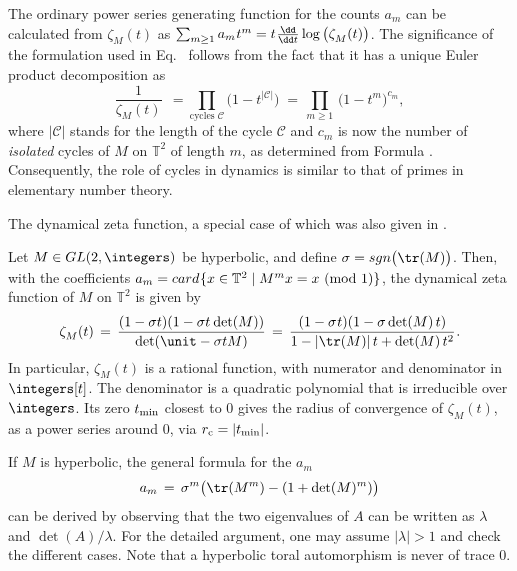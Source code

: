 {The ordinary power series generating function for the counts $a_m$ can
be calculated from $\zeta^{}_{M} (t)$ as $\sum_{m\ge 1} a_m{\hspace{0.5pt}} t^m =
t{\hspace{0.5pt}}\frac{\dd}{\dd t} \log \big(\zeta^{}_{M} (t)\big)$. The
significance of the formulation used in Eq.~
follows from the fact that it has a unique Euler product decomposition
as
\begin{equation} \label{euler1}
   \frac{1}{\zeta^{}_{M} (t)} \;\, = \!
   \prod_{\text{cycles } \mathcal{C}}
   \big( 1- t^{\lvert \mathcal{C}\rvert}\big) \; = \,
   \prod_{m\ge 1}\, \big(1-t^m \big)^{c_m},
\end{equation}
where $\lvert \mathcal{C}\rvert$ stands for the length of the cycle
$\mathcal{C}$ and $c_m$ is now the number of \emph{isolated} cycles
of $M$ on $\mathbb{T}^2$ of length $m$, as determined from Formula
. Consequently, the role of cycles in dynamics is
similar to that of primes in elementary number theory.

The dynamical zeta function, a special case of which was
also given in .

   Let\/ $M\in GL (2,\integers)$ be hyperbolic, and define\/
   $\sigma=sgn \bigl(\tr (M)\bigr)$. Then,
   with the coefficients\/ $a_m = {card{\hspace{0.5pt}}} \{ x\in\mathbb{T}^2\mid M^m x=x
   \mbox{ \rm (mod $1$)}\}$, the dynamical zeta function\/
    of\/  $M$ on\/ $\mathbb{T}^2$ is given by
\[
    \zeta^{}_{M} (t)  \, = \,
    \frac{(1-\sigma t) (1-\sigma t{\hspace{0.5pt}} \det(M))}
    {\det (\unit-\sigma t M )}  \, = \,
    \frac{(1-\sigma{\hspace{0.5pt}} t) (1-\sigma \det(M)\, t)}
    {1-\lvert\tr (M)\rvert\, t+\det(M)\, t^2} {\hspace{0.5pt}} .
\]
   In particular, $\zeta^{}_{M} (t)$ is a rational
   function, with numerator and denominator in\/ $\integers[t]$. The
   denominator is a quadratic polynomial that is irreducible over
   $\integers$.  Its zero $t_{\rm min}$ closest to $0$ gives the radius of
   convergence of $\zeta^{}_{M} (t)$, as a power series around\/ $0$,
   via $r_{\rm c} = \lvert t_{\rm  min} \rvert$.

If $M$ is hyperbolic, the general formula for the $a_m$
\[
    a_m \, = \, \sigma^m \bigl( \tr (M^m)
    - (1 + \det(M)^m )\bigr)
\]
can be derived
by observing that the two eigenvalues of $A$ can be written as $\lambda$
and $\det(A)/\lambda$. For the detailed argument, one may assume
$\lvert\lambda\rvert>1$ and check the different cases. Note that a
hyperbolic toral automorphism is never of trace $0$.

}
